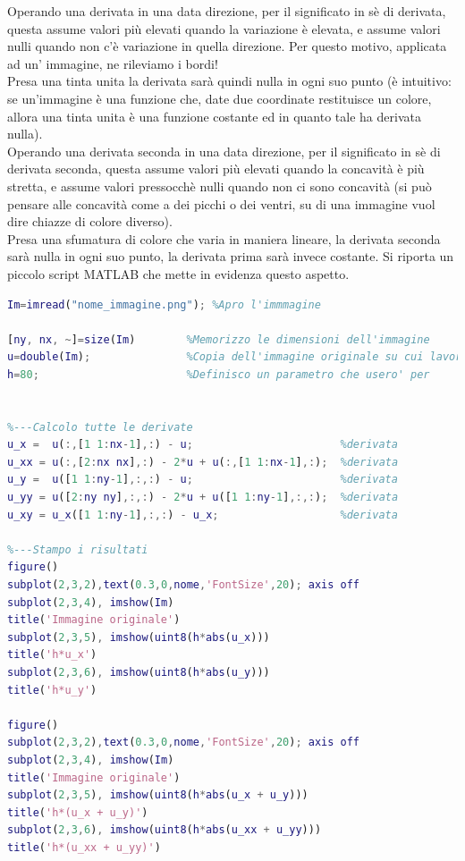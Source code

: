 Operando una derivata in una data direzione, per il significato in sè di derivata, questa assume valori più elevati quando la variazione è elevata, e assume valori nulli quando non c'è variazione in quella direzione. Per questo motivo, applicata ad un' immagine, ne rileviamo i bordi!\\
Presa una tinta unita la derivata sarà quindi nulla in ogni suo punto (è intuitivo: se un'immagine è una funzione che, date due coordinate restituisce un colore, allora una tinta unita è una funzione costante ed in quanto tale ha derivata nulla).\\
\vspace{1em}
Operando una derivata seconda in una data direzione, per il significato in sè di derivata seconda, questa assume valori più elevati quando la concavità è più stretta, e assume valori pressocchè nulli quando non ci sono concavità (si può pensare alle concavità come a dei picchi o dei ventri, su di una immagine vuol dire chiazze di colore diverso).\\
Presa una sfumatura di colore che varia in maniera lineare, la derivata seconda sarà nulla in ogni suo punto, la derivata prima sarà invece costante. 
\newpage
Si riporta un piccolo script MATLAB che mette in evidenza questo aspetto.
\vspace{1em}
\begin{lstlisting}[language=MATLAB]
%---Operazioni preliminari
Im=imread("nome_immagine.png");	%Apro l'immmagine

[ny, nx, ~]=size(Im)        %Memorizzo le dimensioni dell'immagine
u=double(Im);               %Copia dell'immagine originale su cui lavorare
h=80;                       %Definisco un parametro che usero' per                               enfatizzare i bordi in fase di stampa 


%---Calcolo tutte le derivate
u_x =  u(:,[1 1:nx-1],:) - u;                       %derivata                                                            prima lungo x
u_xx = u(:,[2:nx nx],:) - 2*u + u(:,[1 1:nx-1],:);  %derivata                                                            seconda lungo x
u_y =  u([1 1:ny-1],:,:) - u;                       %derivata                                                            prima lungo y
u_yy = u([2:ny ny],:,:) - 2*u + u([1 1:ny-1],:,:);  %derivata                                                            seconda lungo y
u_xy = u_x([1 1:ny-1],:,:) - u_x;                   %derivata                                                            seconda mista
   
%---Stampo i risultati
figure()
subplot(2,3,2),text(0.3,0,nome,'FontSize',20); axis off
subplot(2,3,4), imshow(Im)
title('Immagine originale')
subplot(2,3,5), imshow(uint8(h*abs(u_x)))
title('h*u_x')
subplot(2,3,6), imshow(uint8(h*abs(u_y)))
title('h*u_y')

figure()
subplot(2,3,2),text(0.3,0,nome,'FontSize',20); axis off
subplot(2,3,4), imshow(Im)
title('Immagine originale')
subplot(2,3,5), imshow(uint8(h*abs(u_x + u_y)))
title('h*(u_x + u_y)')
subplot(2,3,6), imshow(uint8(h*abs(u_xx + u_yy)))
title('h*(u_xx + u_yy)')
\end{lstlisting}

